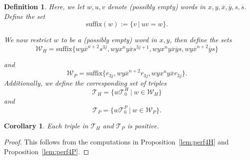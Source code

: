 \documentclass[11pt, reqno]{amsart}
\newtheorem{cor}[thm]{Corollary}
\newtheorem{definition}[thm]{Definition}
\theoremstyle{remark}
\numberwithin{equation}{subsection}
\numberwithin{figure}{section}
\theoremstyle{customremark}
\newcommand{\ov}{\overline}
\newcommand{\T}{\mathcal{T}}
\begin{document}
\begin{definition}
    Here, we let $w,u,v$ denote (possibly empty) words in $x,y,\ov{x},\ov{y},s,\ov{s}$. Define the set
    \[ \text{suffix}(w):=\{v \ | \ uv=w\}.\]
    
    We now restrict $w$ to be a (possibly empty) word in $x,y$, then define the sets \[\mathcal{W}_H=\text{suffix}\{ wy\ov{x}^{n+2}s^{3j},wyx^ny\ov{x}s^{3j+1},wyx^{n}y\ov{x}\ov{y}s,wy\ov{x}^{n+2}\ov{y}s\}\]
   
    and 
    \[ \mathcal{W}_P=\text{suffix}\{r_{3j},wy\ov{x}^{n+2}r_{3j},wyx^ny\ov{x}r_{3j}\}.\]
    Additionally, we define the corresponding set of triples
    \[ \mathcal{T}_H=\{ w\T_0^H \ | \ w \in \mathcal{W}_H\}\]
    and
    \[ \mathcal{T}_P=\{ w\T_0^P \ | \ w \in \mathcal{W}_P\}.\]
    

\end{definition}

 
\begin{cor}\label{cor:Positive}
Each triple in $\mathcal{T}_H$ and $\mathcal{T}_P$ is positive. 
\end{cor}
\begin{proof}
    This follows from the computations in Proposition~\ref{lem:perf4H} and Proposition~\ref{lem:perf4P}.
\end{proof}
\end{document}

